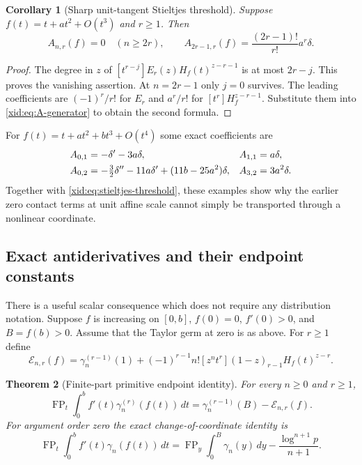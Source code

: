 \documentclass[11pt,a4paper]{article}
\numberwithin{equation}{section}
\newtheorem{theorem}{Theorem}[section]
\newtheorem{corollary}[theorem]{Corollary}
\theoremstyle{definition}
\theoremstyle{remark}
\DeclareMathOperator{\FP}{FP}
\begin{document}
\begin{corollary}[Sharp unit-tangent Stieltjes threshold]
\label{xid:cor:stieltjes-threshold}
Suppose $f(t)=t+a t^2+O(t^3)$ and $r\ge1$.  Then
\begin{equation}\label{xid:eq:stieltjes-threshold}
 A_{n,r}(f)=0\quad(n\ge2r),\qquad
 A_{2r-1,r}(f)=\frac{(2r-1)!}{r!}a^r\delta.
\end{equation}
\end{corollary}

\begin{proof}
The degree in $z$ of
$[t^{r-j}]E_r(z)H_f(t)^{z-r-1}$ is at most $2r-j$.
This proves the vanishing assertion.  At $n=2r-1$ only $j=0$
survives.  The leading coefficients are $(-1)^r/r!$ for $E_r$
and $a^r/r!$ for $[t^r]H_f^{z-r-1}$.  Substitute them into
\eqref{xid:eq:A-generator} to obtain the second formula.
\end{proof}

For $f(t)=t+a t^2+b t^3+O(t^4)$ some exact coefficients are
\begin{align}
 A_{0,1}&=-\delta'-3a\delta,& A_{1,1}&=a\delta,\notag\\
 A_{0,2}&=-\tfrac32\delta''-11a\delta'
                       +(11b-25a^2)\delta,&
 A_{3,2}&=3a^2\delta.\label{xid:eq:A-table}
\end{align}
Together with \eqref{xid:eq:stieltjes-threshold}, these examples show why
the earlier zero contact terms at unit affine scale cannot simply be
transported through a nonlinear coordinate.

\subsection{Exact antiderivatives and their endpoint constants}

There is a useful scalar consequence which does not require any
distribution notation.  Suppose $f$ is increasing on $[0,b]$,
$f(0)=0$, $f'(0)>0$, and $B=f(b)>0$.  Assume that the Taylor germ at
zero is as above.  For $r\ge1$ define
\begin{equation}\label{xid:eq:primitive-E}
 \mathcal E_{n,r}(f)=\gamma_n^{(r-1)}(1)
 +(-1)^{r-1}n![z^nt^r](1-z)_{r-1}H_f(t)^{z-r}.
\end{equation}

\begin{theorem}[Finite-part primitive endpoint identity]
\label{xid:thm:nonlinear-primitive}
For every $n\ge0$ and $r\ge1$,
\begin{equation}\label{xid:eq:nonlinear-primitive}
 \FP_t\int_0^b f'(t)\gamma_n^{(r)}(f(t))\,dt
       =\gamma_n^{(r-1)}(B)-\mathcal E_{n,r}(f).
\end{equation}
For argument order zero the exact change-of-coordinate identity is
\begin{equation}\label{xid:eq:primitive-order0}
 \FP_t\int_0^b f'(t)\gamma_n(f(t))\,dt
 =\FP_y\int_0^B\gamma_n(y)\,dy
       -\frac{\log^{n+1}p}{n+1}.
\end{equation}
\end{theorem}
\end{document}
